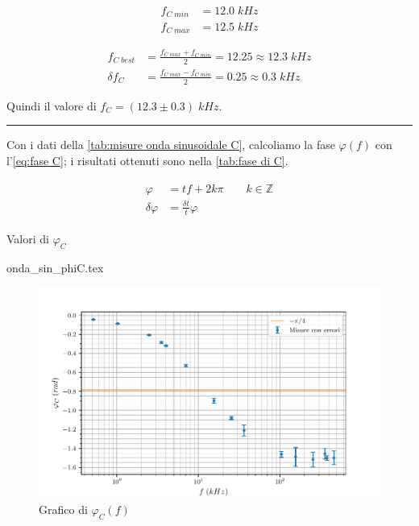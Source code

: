 \documentclass[11pt, a4paper]{article}
\numberwithin{equation}{section} %
\begin{document}
\begin{align*}
    f_{C \; min} &= 12.0 \; kHz \\
    f_{C \; max} &= 12.5 \; kHz
\end{align*}

\begin{align*}
    f_{C \; best} &= \frac{f_{C \; max} + f_{C \; min}}{2} = 12.25 \approx 12.3 \; kHz \\
    \delta f_{C} &= \frac{f_{C \; max} - f_{C \; min}}{2} = 0.25 \approx 0.3 \; kHz
\end{align*}

Quindi il valore di \(f_{C} = (12.3 \pm 0.3) \; kHz\).

\rule{\textwidth}{1pt}

Con i dati della \autoref{tab:misure onda sinusoidale C}, calcoliamo la fase $\varphi(f)$ con l'\autoref{eq:fase C}; i risultati ottenuti sono nella \autoref{tab:fase di C}.

\begin{align} \label{eq:fase C}
    \begin{split}
        \varphi &= tf + 2k\pi \qquad k \in \mathbb{Z} \\
        \delta \varphi &= \frac{\delta t}{t} \varphi
    \end{split}
\end{align}

\begin{table}[ht!]
    \centering
    \caption{Valori di $\varphi_{C}$}
    {onda_sin_phiC.tex}
    \label{tab:fase di C}
\end{table}


\begin{figure}[ht!]
    \includegraphics{onda_sin_phi(f)_C.pdf}
    \caption{Grafico di $\varphi_{C}(f)$}
    \label{fig:fase C}
\end{figure}
\end{document}
